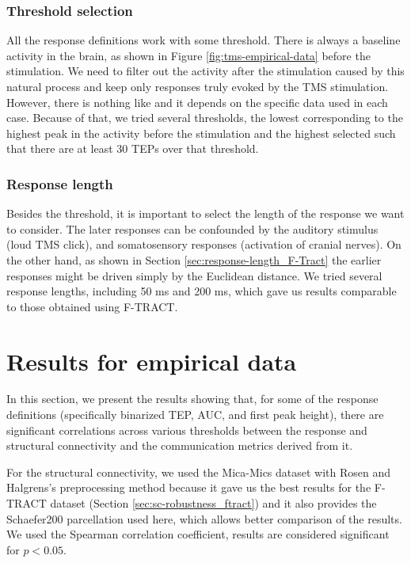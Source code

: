 \subsubsection{Threshold selection}

All the response definitions work with some threshold. There is always a baseline activity in the brain, as shown in Figure \ref{fig:tms-empirical-data} before the stimulation. We need to filter out the activity after the stimulation caused by this natural process and keep only responses truly evoked by the TMS stimulation. However, there is nothing like  and it depends on the specific data used in each case. Because of that, we tried several thresholds, the lowest corresponding to the highest peak in the activity before the stimulation and the highest selected such that there are at least 30 TEPs over that threshold.

\subsubsection{Response length}

Besides the threshold, it is important to select the length of the response we want to consider. The later responses can be confounded by the auditory stimulus (loud TMS click), and somatosensory responses (activation of cranial nerves). \cite{hernandez-pavon_tms_2023} On the other hand, as shown in Section \ref{sec:response-length_F-Tract} the earlier responses might be driven simply by the Euclidean distance. We tried several response lengths, including 50 ms and 200 ms, which gave us results comparable to those obtained using F-TRACT.

\section{Results for empirical data}\label{sec:results_pytepfit-empirical}

In this section, we present the results showing that, for some of the response definitions (specifically binarized TEP, AUC, and first peak height), there are significant correlations across various thresholds between the response and structural connectivity and the communication metrics derived from it. 

For the structural connectivity, we used the Mica-Mics dataset with Rosen and Halgrens's preprocessing method because it gave us the best results for the F-TRACT dataset (Section \ref{sec:sc-robustness_ftract}) and it also provides the Schaefer200 parcellation used here, which allows better comparison of the results. We used the Spearman correlation coefficient, results are considered significant for $p<0.05$.

